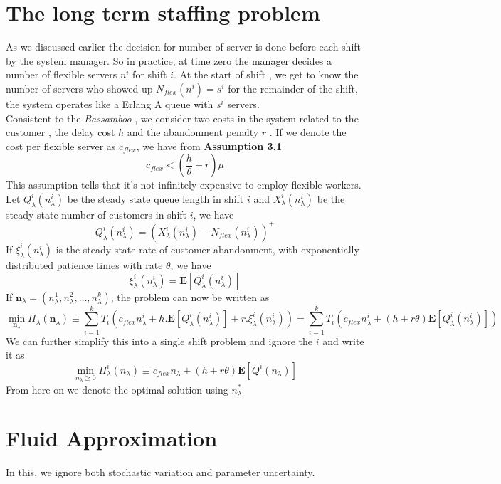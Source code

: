 \section{The long term staffing problem}
As we discussed earlier the decision for number of server is done before each shift by the system manager. So in practice, at time zero the manager decides a number of flexible servers $n^i$ for shift $i$. At the start of shift , we get to know the number of servers who showed up $N_{flex}(n^i)=s^i$ for the remainder of the shift, the system operates like a Erlang A queue with $s^i$ servers.
\\ Consistent to the \textit{Bassamboo}\cite{bassamboo} , we consider two costs in the system related to the customer , the delay cost $h$ and the abandonment penalty $r$ . If we denote the cost per flexible server as $c_{flex}$, we have from \textbf{Assumption 3.1} 
$$c_{flex} < (\frac{h}{\theta}+r)\mu$$ This assumption tells that it's not infinitely expensive to employ flexible workers.
\\ Let ${Q}_{\lambda}^{i}(n_\lambda^{i})$ be the steady state queue length in shift $i$ and ${X}_{\lambda}^{i}(n_\lambda^{i})$ be the steady state number of customers in shift $i$, we have
$${Q}_{\lambda}^{i}(n_\lambda^{i})=({X}_{\lambda}^{i}(n_\lambda^{i})-N_{flex}(n_\lambda^{i}))^{+}$$
If ${\xi}_{\lambda}^{i}(n_\lambda^{i})$ is the steady state rate of customer abandonment, with exponentially distributed patience times with rate $\theta$, we have
$${\xi}_{\lambda}^{i}(n_\lambda^{i})=\mathbf{E}[{Q}_{\lambda}^{i}(n_\lambda^{i})]$$
If $\textbf{n}_\lambda = (n_\lambda^1,n_\lambda^2,\hdots,n_\lambda^k)$, the problem can now be written as
 \begin{equation}
     \min_{\textbf{n}_\lambda} {\Pi}_{\lambda}(\textbf{n}_\lambda)
    \equiv \sum_{i=1}^{k}{T_{i}(c_{flex}n_\lambda^{i}+h.\mathbf{E}[{Q}_{\lambda}^{i}(n_\lambda^{i})]+r.{\xi}_{\lambda}^{i}(n_\lambda^{i}))}
    =\sum_{i=1}^{k}{T_{i}(c_{flex}n_\lambda^{i}+(h+r\theta)\mathbf{E}[{Q}_{\lambda}^{i}(n_\lambda^{i})])}
\end{equation}
We can further simplify this into a single shift problem and ignore the $i$ and write it as
\begin{equation}
    \min_{{n}_\lambda \geq 0} {\Pi}_{\lambda}^i({n}_\lambda) \equiv c_{flex}n_\lambda+(h+r\theta)\mathbf{E}[{Q}^i(n_\lambda)]
\end{equation}
From here on we denote the optimal solution using $n_\lambda^{*}$
\section{Fluid Approximation}
In this, we ignore both stochastic variation and parameter uncertainty.
